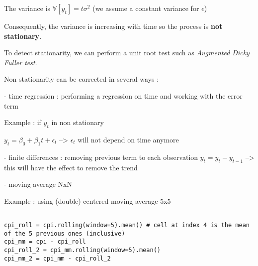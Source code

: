 The variance is $\mathbb{V}[y_t] = t \sigma^2$ (we assume a constant variance for $\epsilon$)

Consequently, the variance is increasing with time so the process is \textbf{not stationary}.

\vspace{5mm}

To detect stationarity, we can perform a unit root test such as \textit{Augmented Dicky Fuller test}.

\vspace{5mm}

Non stationarity can be corrected in several ways :

- time regression : performing a regression on time and working with the error term

Example : if $y_t$ in non stationary

$y_t = \beta_0 + \beta_1 t +\epsilon_t$ --> $\epsilon_t$ will not depend on time anymore

- finite differences : removing previous term to each observation $y_t = y_t - y_{t-1}$ --> this will have the effect to remove the trend

- moving average NxN

Example : using (double) centered moving average 5x5 

\lstset{language=Python}
\lstset{frame=lines}
\lstset{basicstyle=\footnotesize}
\begin{lstlisting}

cpi_roll = cpi.rolling(window=5).mean() # cell at index 4 is the mean of the 5 previous ones (inclusive)
cpi_mm = cpi - cpi_roll
cpi_roll_2 = cpi_mm.rolling(window=5).mean()
cpi_mm_2 = cpi_mm - cpi_roll_2

\end{lstlisting}

\vspace{5mm}